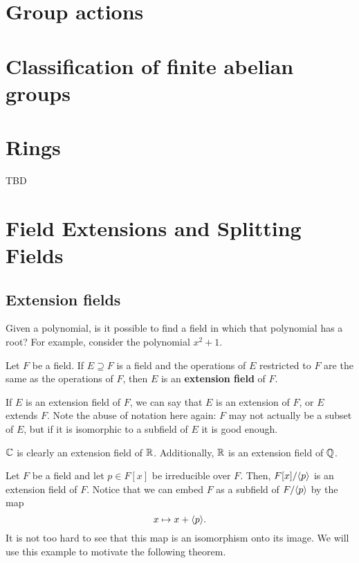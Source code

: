 \documentclass[oneside]{book}
\begin{document}
\chapter{Group actions}
\label{chapter:group-actions}


\chapter{Classification of finite abelian groups}
\label{chapter:classification-of-finite-abelian-groups}


\chapter{Rings}
TBD
 
\chapter{Field Extensions and Splitting Fields}

\section{Extension fields}
Given a polynomial, is it possible to find a field in which that polynomial has
a root? For example, consider the polynomial $x^2 + 1$. 

\begin{definition}
    Let $F$ be a field. If $E \supseteq F$ is a field and the operations of $E$
    restricted to $F$ are the same as the operations of $F$, then $E$ is an
    \textbf{extension field} of $F$.
\end{definition}
If $E$ is an extension field of $F$, we can say that $E$ is an extension of $F$,
or $E$ extends $F$. Note the abuse of notation here again: $F$ may not actually
be a subset of $E$, but if it is isomorphic to a subfield of $E$ it is good
enough.

\begin{example}
    $\mathbb{C}$ is clearly an extension field of $\mathbb{R}$. Additionally, $\mathbb{R}$ is an
    extension field of $\mathbb{Q}$.
\end{example}

\begin{example}
    Let $F$ be a field and let $p \in F[x]$ be irreducible over $F$. Then,
    $F[x]/{ \langle p \rangle }$ is an extension field of $F$. Notice that we can embed $F$ as
    a subfield of $F/{ \langle p \rangle }$ by the map 
    \[
        x \mapsto x + { \langle p \rangle }.
    \]
    It is not too hard to see that this map is an isomorphism onto its image. We
    will use this example to motivate the following theorem.
\end{example}
\end{document}
